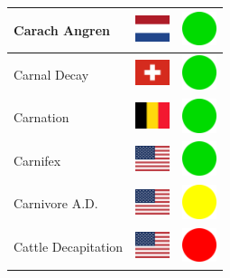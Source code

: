 \documentclass[12pt, a4paper, twoside]{report}
\begin{document}
\begin{center}
\begin{longtable}{|p{5cm}|p{2cm}|p{2cm}|}
 Carach Angren                                              & \includegraphics[width=1cm]{../4x3/nl} &   \includegraphics[width=1cm]{../likes/y} \\ \hline
 Carnal Decay                                               & \includegraphics[width=1cm]{../4x3/ch} &   \includegraphics[width=1cm]{../likes/y} \\ \hline
 Carnation                                                  & \includegraphics[width=1cm]{../4x3/be} &   \includegraphics[width=1cm]{../likes/y} \\ \hline
 Carnifex                                                   & \includegraphics[width=1cm]{../4x3/us} &   \includegraphics[width=1cm]{../likes/y} \\ \hline
 Carnivore A.D.                                             & \includegraphics[width=1cm]{../4x3/us} &   \includegraphics[width=1cm]{../likes/m} \\ \hline
 Cattle Decapitation                                        & \includegraphics[width=1cm]{../4x3/us} &   \includegraphics[width=1cm]{../likes/n} \\ \hline

\end{longtable}
\end{center}
\end{document}
